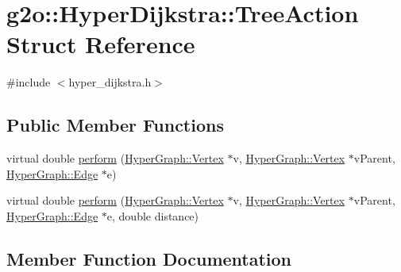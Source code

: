 \hypertarget{structg2o_1_1_hyper_dijkstra_1_1_tree_action}{}\section{g2o\+:\+:Hyper\+Dijkstra\+:\+:Tree\+Action Struct Reference}
\label{structg2o_1_1_hyper_dijkstra_1_1_tree_action}


{\ttfamily \#include $<$hyper\+\_\+dijkstra.\+h$>$}

\subsection*{Public Member Functions}
\begin{DoxyCompactItemize}
\item 
virtual double \mbox{\hyperlink{structg2o_1_1_hyper_dijkstra_1_1_tree_action_aacd1280762e801f05b04874950cf052b}{perform}} (\mbox{\hyperlink{classg2o_1_1_hyper_graph_1_1_vertex}{Hyper\+Graph\+::\+Vertex}} $\ast$v, \mbox{\hyperlink{classg2o_1_1_hyper_graph_1_1_vertex}{Hyper\+Graph\+::\+Vertex}} $\ast$v\+Parent, \mbox{\hyperlink{classg2o_1_1_hyper_graph_1_1_edge}{Hyper\+Graph\+::\+Edge}} $\ast$e)
\item 
virtual double \mbox{\hyperlink{structg2o_1_1_hyper_dijkstra_1_1_tree_action_a2f78bac199af9afea7105f3dd9f2e963}{perform}} (\mbox{\hyperlink{classg2o_1_1_hyper_graph_1_1_vertex}{Hyper\+Graph\+::\+Vertex}} $\ast$v, \mbox{\hyperlink{classg2o_1_1_hyper_graph_1_1_vertex}{Hyper\+Graph\+::\+Vertex}} $\ast$v\+Parent, \mbox{\hyperlink{classg2o_1_1_hyper_graph_1_1_edge}{Hyper\+Graph\+::\+Edge}} $\ast$e, double distance)
\end{DoxyCompactItemize}


\subsection{Member Function Documentation}
\mbox{\label{structg2o_1_1_hyper_dijkstra_1_1_tree_action_aacd1280762e801f05b04874950cf052b}} 
